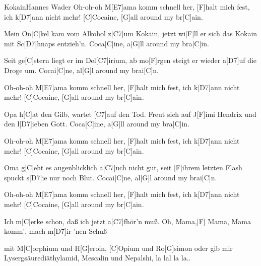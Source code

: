 \documentclass[../main.tex]{subfiles}
\begin{document}
\begin{song}{Kokain}{Hannes Wader}{}
Oh-oh-oh M[E7]ama komm schnell her, [F]halt mich fest, ich k[D7]ann nicht mehr!
[C]Cocaine, [G]all around my br[C]ain.

Mein On[C]kel kam vom Alkohol z[C7]um Kokain, jetzt wi[F]ll er sich das Kokain mit Sc[D7]hnaps entzieh'n.
Coca[C]ine, a[G]ll around my bra[C]in.

Seit ge[C]stern liegt er im Del[C7]irium, ab mo[F]rgen steigt er wieder a[D7]uf die Droge um.
Cocai[C]ne, al[G]l around my brai[C]n.

Oh-oh-oh M[E7]ama komm schnell her, [F]halt mich fest, ich k[D7]ann nicht mehr!
[C]Cocaine, [G]all around my br[C]ain.

Opa h[C]at den Gilb, wartet [C7]auf den Tod. Freut sich auf J[F]imi Hendrix und den l[D7]ieben Gott.
Coca[C]ine, a[G]ll around my bra[C]in.

Oh-oh-oh M[E7]ama komm schnell her, [F]halt mich fest, ich k[D7]ann nicht mehr!
[C]Cocaine, [G]all around my br[C]ain.

Oma g[C]eht es augenblicklich a[C7]uch nicht gut, seit [F]ihrem letzten Flash spuckt s[D7]ie nur noch Blut.
Cocai[C]ne, al[G]l around my brai[C]n.

Oh-oh-oh M[E7]ama komm schnell her, [F]halt mich fest, ich k[D7]ann nicht mehr!
[C]Cocaine, [G]all around my br[C]ain.

Ich m[C]erke schon, daß ich jetzt a[C7]fhör'n muß.
Oh, Mama,[F] Mama, Mama komm', mach m[D7]ir 'nen Schuß

mit M[C]orphium und H[G]eroin, [C]Opium und Ro[G]simon oder
gib mir Lysergsäurediäthylamid, Mescalin und Nepalshi, la lal la la..

\end{song}
\end{document}
